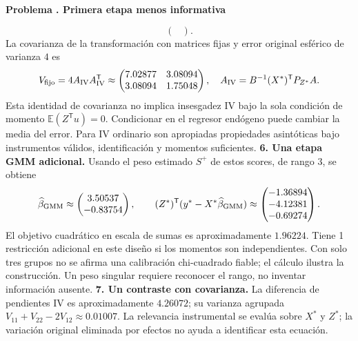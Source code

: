 \documentclass[11pt,a4paper]{article}
\newcommand{\E}{\mathbb E}
\newcommand{\T}{^{\mathsf T}}
\theoremstyle{definition}
\newcounter{problema}
\newenvironment{resuelto}[1]{\refstepcounter{problema}\par\medskip\Needspace{6\baselineskip}\textbf{Problema \theproblema. #1}\par}{\par\medskip}
\begin{document}
\begin{resuelto}{Primera etapa menos informativa}
\[\begin{pmatrix}
\end{pmatrix}.
\]
La covarianza de la transformación con matrices fijas y error original esférico de varianza $4$ es
\[
V_{\rm fijo}=4A_{\rm IV}A_{\rm IV}\T\approx\begin{pmatrix}
7.02877&3.08094\\3.08094&1.75048
\end{pmatrix},\quad A_{\rm IV}=B^{-1}(X^*)\T P_{Z^*}A.
\]
Esta identidad de covarianza no implica insesgadez IV bajo la sola condición de momento $\E(Z\T u)=0$. Condicionar en el regresor endógeno puede cambiar la media del error. Para IV ordinario son apropiadas propiedades asintóticas bajo instrumentos válidos, identificación y momentos suficientes.
\textbf{6. Una etapa GMM adicional.} Usando el peso estimado $S^+$ de estos scores, de rango $3$, se obtiene
\[
\widehat\beta_{\rm GMM}\approx\begin{pmatrix}
3.50537\\-0.83754
\end{pmatrix},\qquad
(Z^*)\T(y^*-X^*\widehat\beta_{\rm GMM})\approx\begin{pmatrix}
-1.36894\\-4.12381\\-0.69274
\end{pmatrix}.
\]
El objetivo cuadrático en escala de sumas es aproximadamente $1.96224$. Tiene 1 restricción adicional en este diseño si los momentos son independientes. Con solo tres grupos no se afirma una calibración chi-cuadrado fiable; el cálculo ilustra la construcción. Un peso singular requiere reconocer el rango, no inventar información ausente.
\textbf{7. Un contraste con covarianza.} La diferencia de pendientes IV es aproximadamente $4.26072$; su varianza agrupada $V_{11}+V_{22}-2V_{12}\approx0.01007$. La relevancia instrumental se evalúa sobre $X^*$ y $Z^*$; la variación original eliminada por efectos no ayuda a identificar esta ecuación.
\end{resuelto}
\end{document}
